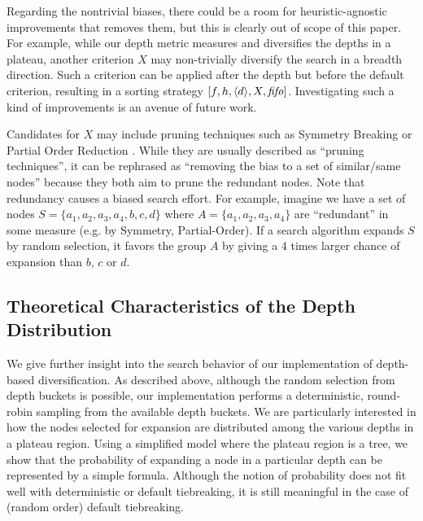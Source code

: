 Regarding the nontrivial biases, there could be a room for heuristic-agnostic improvements that removes them, but
this is clearly out of scope of this paper.   For example, while our depth
metric measures and diversifies the depths in a plateau, another criterion $X$ may non-trivially diversify the
search in a breadth direction.  Such a criterion can be applied after the depth but before the default criterion,
resulting in a sorting strategy $[f,h,{\left<d\right>},X,{\text{\textit{fifo}}}]$. Investigating such a kind of improvements is an avenue of
future work.

Candidates for $X$ may
include pruning techniques such as Symmetry Breaking \cite{Fox1998,pochter2011exploiting,domshlak2013symmetry} or
Partial Order Reduction \cite{hall2013faster,wehrle2013relative}.
While they are usually described as ``pruning techniques'',
it can be rephrased as ``removing the bias to a set of similar/same nodes'' because
they both aim to prune the redundant nodes.
Note that redundancy causes a biased search effort. For example, imagine we have a
set of nodes $S=\{a_1, a_2, a_3, a_4, b, c, d\}$ where
$A=\{a_1, a_2, a_3, a_4\}$ are ``redundant'' in some measure (e.g. by Symmetry,
Partial-Order). 
If a search algorithm expands $S$ by random selection, it favors the
group $A$ by giving a 4 times larger chance of expansion than $b$,
$c$ or $d$.

\subsection{Theoretical Characteristics of the Depth Distribution}
\label{sec:theoretical-characteristics}

We give further insight into the search behavior of our implementation
of depth-based diversification.
As described above, although the random selection from depth buckets is possible, our implementation performs a deterministic, round-robin sampling from the available depth buckets.
% 
We are particularly interested in how the nodes selected for expansion are distributed 
among the various depths in a plateau region.
Using a simplified model where the plateau region is a tree,
we show that the probability of expanding a node in a particular depth
can be represented by a simple formula.  Although the notion of
probability does not fit well with deterministic \fifo or \lifo
default tiebreaking, it is still meaningful in the case of \ro (random
order) default tiebreaking.

